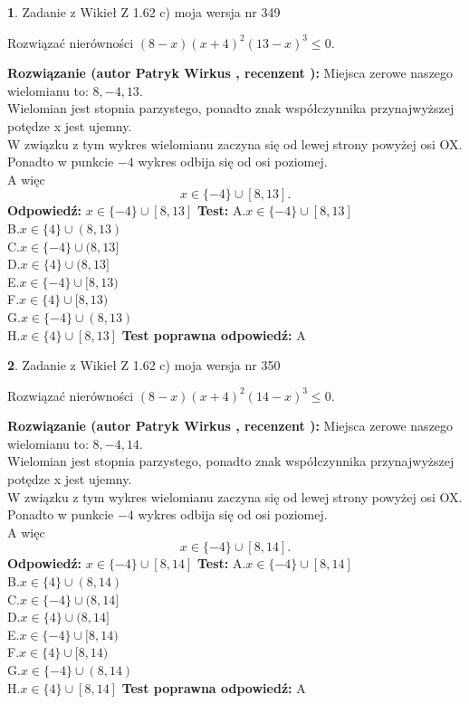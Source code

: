 \documentclass[12pt, a4paper]{article}
\theoremstyle{definition} %
\newtheorem{zad}{}
\newcommand{\zadStart}[1]{\begin{zad}#1\newline}
\newcommand{\zadStop}{\end{zad}}
\newcommand{\rozwStart}[2]{\noindent \textbf{Rozwiązanie (autor #1 , recenzent #2): }\newline}
\newcommand{\rozwStop}{\newline}
\newcommand{\odpStart}{\noindent \textbf{Odpowiedź:}\newline}
\newcommand{\odpStop}{\newline}
\newcommand{\testStart}{\noindent \textbf{Test:}\newline}
\newcommand{\testStop}{\newline}
\newcommand{\kluczStart}{\noindent \textbf{Test poprawna odpowiedź:}\newline}
\newcommand{\kluczStop}{\newline}
\begin{document}
\zadStart{Zadanie z Wikieł Z 1.62 c) moja wersja nr 349}

Rozwiązać nierówności $(8-x)(x+4)^{2}(13-x)^{3}\le0$.
\zadStop
\rozwStart{Patryk Wirkus}{}
Miejsca zerowe naszego wielomianu to: $8, -4, 13$.\\
Wielomian jest stopnia parzystego, ponadto znak współczynnika przy\linebreak najwyższej potędze x jest ujemny.\\ W związku z tym wykres wielomianu zaczyna się od lewej strony powyżej osi OX.\\
Ponadto w punkcie $-4$ wykres odbija się od osi poziomej.\\
A więc $$x \in \{-4\} \cup [8,13].$$
\rozwStop
\odpStart
$x \in \{-4\} \cup [8,13]$
\odpStop
\testStart
A.$x \in \{-4\} \cup [8,13]$\\
B.$x \in \{4\} \cup (8,13)$\\
C.$x \in \{-4\} \cup (8,13]$\\
D.$x \in \{4\} \cup (8,13]$\\
E.$x \in \{-4\} \cup [8,13)$\\
F.$x \in \{4\} \cup [8,13)$\\
G.$x \in \{-4\} \cup (8,13)$\\
H.$x \in \{4\} \cup [8,13]$
\testStop
\kluczStart
A
\kluczStop



\zadStart{Zadanie z Wikieł Z 1.62 c) moja wersja nr 350}

Rozwiązać nierówności $(8-x)(x+4)^{2}(14-x)^{3}\le0$.
\zadStop
\rozwStart{Patryk Wirkus}{}
Miejsca zerowe naszego wielomianu to: $8, -4, 14$.\\
Wielomian jest stopnia parzystego, ponadto znak współczynnika przy\linebreak najwyższej potędze x jest ujemny.\\ W związku z tym wykres wielomianu zaczyna się od lewej strony powyżej osi OX.\\
Ponadto w punkcie $-4$ wykres odbija się od osi poziomej.\\
A więc $$x \in \{-4\} \cup [8,14].$$
\rozwStop
\odpStart
$x \in \{-4\} \cup [8,14]$
\odpStop
\testStart
A.$x \in \{-4\} \cup [8,14]$\\
B.$x \in \{4\} \cup (8,14)$\\
C.$x \in \{-4\} \cup (8,14]$\\
D.$x \in \{4\} \cup (8,14]$\\
E.$x \in \{-4\} \cup [8,14)$\\
F.$x \in \{4\} \cup [8,14)$\\
G.$x \in \{-4\} \cup (8,14)$\\
H.$x \in \{4\} \cup [8,14]$
\testStop
\kluczStart
A
\kluczStop
\end{document}
